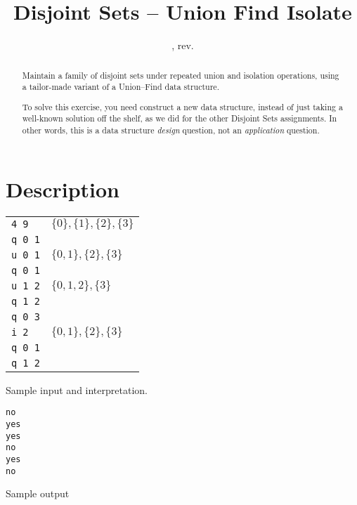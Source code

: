 \documentclass{tufte-handout}
\title{Disjoint Sets -- Union Find Isolate}
\author{}
\date{\GITAuthorDate, rev. \GITAbrHash}
\begin{document}
\maketitle

\begin{abstract}
  Maintain a family of disjoint sets under repeated union and isolation operations, using a tailor-made variant of a Union--Find data structure.

  To solve this exercise, you need construct a new data structure, instead of just taking a well-known solution off the shelf, as we did for the other Disjoint Sets assignments.
  In other words, this is a data structure \emph{design} question, not an \emph{application} question.
\end{abstract}

\section{Description}
\begin{marginfigure}
  \begin{tabular}{ll}
    \texttt{4 9}   & $\{0\}, \{1\}, \{2\},\{3\}$\\
    \texttt{q 0 1} \\
    \texttt{u 0 1} & $\{0, 1\}, \{2\},\{3\}$ \\
    \texttt{q 0 1} &\\
    \texttt{u 1 2} & $\{0, 1, 2\},\{3\}$ \\
    \texttt{q 1 2} &\\
    \texttt{q 0 3} &\\
    \texttt{i 2}   & $\{0, 1\}, \{2\},\{3\}$ \\
    \texttt{q 0 1} &\\
    \texttt{q 1 2} &
  \end{tabular}
  \caption{Sample input and interpretation.}
\end{marginfigure}

\begin{marginfigure}
  \begin{verbatim}
no
yes
yes
no
yes
no
  \end{verbatim}
  \caption{Sample output}
\end{marginfigure}
\end{document}
